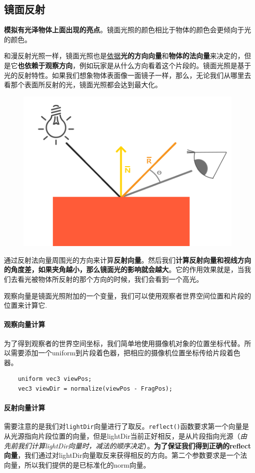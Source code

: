 \documentclass[UTF8,a4paper,12pt]{ctexbook}
\begin{document}
			
			
		\subsection{镜面反射}
			\textbf{模拟有光泽物体上面出现的亮点}。镜面光照的颜色相比于物体的颜色会更倾向于光的颜色。
			
			和漫反射光照一样，镜面光照也是\underline{依据}\textbf{光的方向向量}和\textbf{物体的法向量}来决定的，但是它\textbf{也依赖于观察方向}，例如玩家是从什么方向看着这个片段的。镜面光照是基于光的反射特性。如果我们想象物体表面像一面镜子一样，那么，无论我们从哪里去看那个表面所反射的光，镜面光照都会达到最大化。
			
			\begin{figure}[H]
				\centering
				\includegraphics[width=.7\linewidth]{basic_lighting_specular_theory}
			\end{figure}
			
			通过反射法向量周围光的方向来计算\textbf{反射向量}。然后我们\textbf{计算反射向量和视线方向的角度差，如果夹角越小，那么镜面光的影响就会越大}。它的作用效果就是，当我们去看光被物体所反射的那个方向的时候，我们会看到一个高光。
			
			观察向量是镜面光照附加的一个变量，我们可以使用观察者世界空间位置和片段的位置来计算它.
			
			\paragraph{观察向量计算}
				为了得到观察者的世界空间坐标，我们简单地使用摄像机对象的位置坐标代替。所以需要添加一个uniform到片段着色器，把相应的摄像机位置坐标传给片段着色器。
				\begin{lstlisting}
	uniform vec3 viewPos;
	vec3 viewDir = normalize(viewPos - FragPos);			
				\end{lstlisting}

			\paragraph{反射向量计算}
				需要注意的是我们对\verb|lightDir|向量进行了取反。\verb|reflect()|函数要求第一个向量是从光源指向片段位置的向量，但是lightDir当前正好相反，是从片段指向光源（\textit{由先前我们计算lightDir向量时，减法的顺序决定}）。\textbf{为了保证我们得到正确的reflect向量}，我们通过对lightDir向量取反来获得相反的方向。第二个参数要求是一个法向量，所以我们提供的是已标准化的norm向量。
				
\end{document}
